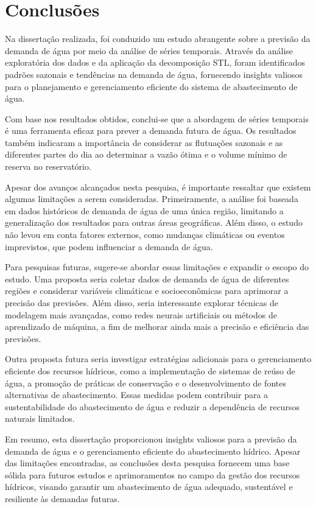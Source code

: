 \section{Conclus\~oes} \label{sec:conclusoes}

Na dissertação realizada, foi conduzido um estudo abrangente sobre a previsão da demanda de água por meio da análise de séries temporais. Através da análise exploratória dos dados e da aplicação da decomposição STL, foram identificados padrões sazonais e tendências na demanda de água, fornecendo insights valiosos para o planejamento e gerenciamento eficiente do sistema de abastecimento de água.

Com base nos resultados obtidos, conclui-se que a abordagem de séries temporais é uma ferramenta eficaz para prever a demanda futura de água. Os resultados também indicaram a importância de considerar as flutuações sazonais e as diferentes partes do dia ao determinar a vazão ótima e o volume mínimo de reserva no reservatório.

Apesar dos avanços alcançados nesta pesquisa, é importante ressaltar que existem algumas limitações a serem consideradas. Primeiramente, a análise foi baseada em dados históricos de demanda de água de uma única região, limitando a generalização dos resultados para outras áreas geográficas. Além disso, o estudo não levou em conta fatores externos, como mudanças climáticas ou eventos imprevistos, que podem influenciar a demanda de água.

Para pesquisas futuras, sugere-se abordar essas limitações e expandir o escopo do estudo. Uma proposta seria coletar dados de demanda de água de diferentes regiões e considerar variáveis climáticas e socioeconômicas para aprimorar a precisão das previsões. Além disso, seria interessante explorar técnicas de modelagem mais avançadas, como redes neurais artificiais ou métodos de aprendizado de máquina, a fim de melhorar ainda mais a precisão e eficiência das previsões.

Outra proposta futura seria investigar estratégias adicionais para o gerenciamento eficiente dos recursos hídricos, como a implementação de sistemas de reúso de água, a promoção de práticas de conservação e o desenvolvimento de fontes alternativas de abastecimento. Essas medidas podem contribuir para a sustentabilidade do abastecimento de água e reduzir a dependência de recursos naturais limitados.

Em resumo, esta dissertação proporcionou insights valiosos para a previsão da demanda de água e o gerenciamento eficiente do abastecimento hídrico. Apesar das limitações encontradas, as conclusões desta pesquisa fornecem uma base sólida para futuros estudos e aprimoramentos no campo da gestão dos recursos hídricos, visando garantir um abastecimento de água adequado, sustentável e resiliente às demandas futuras.

